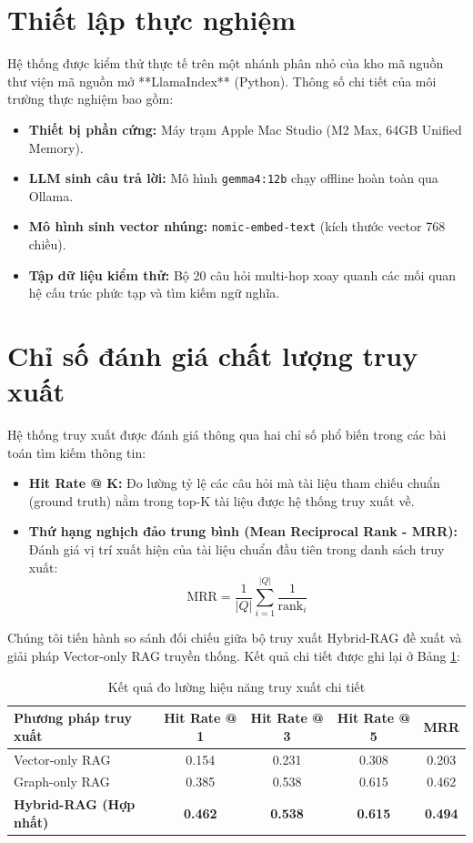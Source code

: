 \documentclass[12pt,a4paper,oneside]{report}
\begin{document}
\section{Thiết lập thực nghiệm}
Hệ thống được kiểm thử thực tế trên một nhánh phân nhỏ của kho mã nguồn thư viện mã nguồn mở **LlamaIndex** (Python). Thông số chi tiết của môi trường thực nghiệm bao gồm:
\begin{itemize}
    \item \textbf{Thiết bị phần cứng:} Máy trạm Apple Mac Studio (M2 Max, 64GB Unified Memory).
    \item \textbf{LLM sinh câu trả lời:} Mô hình \texttt{gemma4:12b} chạy offline hoàn toàn qua Ollama.
    \item \textbf{Mô hình sinh vector nhúng:} \texttt{nomic-embed-text} (kích thước vector 768 chiều).
    \item \textbf{Tập dữ liệu kiểm thử:} Bộ 20 câu hỏi multi-hop xoay quanh các mối quan hệ cấu trúc phức tạp và tìm kiếm ngữ nghĩa.
\end{itemize}

\section{Chỉ số đánh giá chất lượng truy xuất}
Hệ thống truy xuất được đánh giá thông qua hai chỉ số phổ biến trong các bài toán tìm kiếm thông tin:
\begin{itemize}
    \item \textbf{Hit Rate @ K:} Đo lường tỷ lệ các câu hỏi mà tài liệu tham chiếu chuẩn (ground truth) nằm trong top-K tài liệu được hệ thống truy xuất về.
    \item \textbf{Thứ hạng nghịch đảo trung bình (Mean Reciprocal Rank - MRR):} Đánh giá vị trí xuất hiện của tài liệu chuẩn đầu tiên trong danh sách truy xuất:
    \begin{equation}
        \text{MRR} = \frac{1}{|Q|} \sum_{i=1}^{|Q|} \frac{1}{\text{rank}_i}
    \end{equation}
\end{itemize}

Chúng tôi tiến hành so sánh đối chiếu giữa bộ truy xuất Hybrid-RAG đề xuất và giải pháp Vector-only RAG truyền thống. Kết quả chi tiết được ghi lại ở Bảng \ref{tab:results_detail_vi}:

\begin{table}[h]
    \centering
    \caption{Kết quả đo lường hiệu năng truy xuất chi tiết}
    \label{tab:results_detail_vi}
    \begin{tabular}{lcccc}
        \toprule
        \textbf{Phương pháp truy xuất} & \textbf{Hit Rate @ 1} & \textbf{Hit Rate @ 3} & \textbf{Hit Rate @ 5} & \textbf{MRR} \\
        \midrule
        Vector-only RAG & 0.154 & 0.231 & 0.308 & 0.203 \\
        Graph-only RAG & 0.385 & 0.538 & 0.615 & 0.462 \\
        \textbf{Hybrid-RAG (Hợp nhất)} & \textbf{0.462} & \textbf{0.538} & \textbf{0.615} & \textbf{0.494} \\
        \bottomrule
    \end{tabular}
\end{table}
\end{document}
